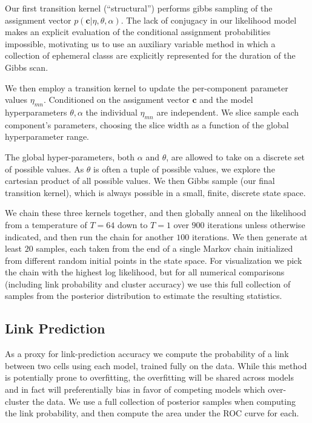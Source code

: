\documentclass{article}
\renewcommand{\vec}[1]{\mathbf{#1}}
\begin{document}
{Our first transition kernel (``structural'') performs gibbs sampling 
of the assignment vector $p(\vec{c} | \eta, \theta, \alpha)$. 
The lack of conjugacy in our likelihood model makes an explicit 
evaluation of the conditional assignment probabilities impossible, 
motivating us to use an auxiliary variable method \autocite{Neal2000}
in which a collection of ephemeral classs are explicitly represented
for the duration of the Gibbs scan. 

We then employ a transition kernel to update the per-component
parameter values $\eta_{mn}$. Conditioned on the assignment vector
$\vec{c}$ and the model hyperparameters $\theta, \alpha$ the 
individual $\eta_{mn}$ are independent. We slice sample \autocite{Neal2003}
each component's parameters, choosing the slice width as a function
of the global hyperparameter range. 

The global hyper-parameters, both $\alpha$ and $\theta$, are allowed
to take on a discrete set of possible values. As $\theta$ is often a
tuple of possible values, we explore the cartesian product of all
possible values. We then Gibbs sample (our final transition kernel),
which is always possible in a small, finite, discrete state space.

We chain these three kernels together, and then globally anneal on the
likelihood from a temperature of $T=64$ down to $T=1$ over $900$
iterations unless otherwise indicated, and then run the chain for
another $100$ iterations. We then generate at least $20$ samples, each
taken from the end of a single Markov chain initialized from different
random initial points in the state space. For visualization we pick the
chain with the highest log likelihood, but for all numerical
comparisons (including link probability and cluster accuracy) we use this full
collection of samples from the posterior distribution to estimate the
resulting statistics.

\subsection*{Link Prediction}
As a proxy for link-prediction accuracy we compute the probability of a link
between two cells using each model, trained fully on the data. While this method
is potentially prone to overfitting, the overfitting will be shared across models
and in fact will preferentially bias in favor of competing models
which over-cluster the data. We use a full collection of posterior samples when
computing the link probability, and then compute the area under the ROC curve for
each. 

}
\end{document}
